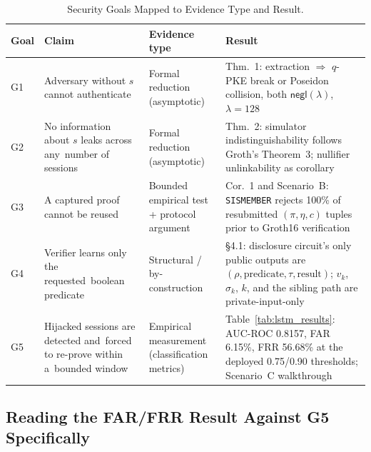\documentclass[12pt,a4paper,oneside]{report}
\begin{document}
\begin{table}[htbp]
\renewcommand{\arraystretch}{1.3}
\caption{Security Goals Mapped to Evidence Type and Result.}
\label{tab:goal_evidence}
\centering
\footnotesize
\begin{tabular}{p{1.6cm}p{3.6cm}p{2.4cm}p{4.0cm}}
\toprule
\textbf{Goal} & \textbf{Claim} & \textbf{Evidence type} & \textbf{Result} \\
\midrule
G1 & Adversary without $s$ cannot authenticate &
Formal reduction (asymptotic) & Thm.~1: extraction $\Rightarrow$
$q$-PKE break or Poseidon collision, both $\mathsf{negl}(\lambda)$,
$\lambda{=}128$ \\[3pt]
G2 & No information about $s$ leaks across any\ number of sessions &
Formal reduction (asymptotic) & Thm.~2: simulator indistinguishability
follows Groth's Theorem~3; nullifier unlinkability as corollary \\[3pt]
G3 & A captured proof cannot be reused &
Bounded empirical test + protocol argument & Cor.~1 and
Scenario~B: \texttt{SISMEMBER} rejects 100\% of resubmitted
$(\pi,\eta,c)$ tuples prior to Groth16 verification \\[3pt]
G4 & Verifier learns only the requested\ boolean predicate &
Structural / by-construction & \S4.1: disclosure circuit's only
public outputs are $(\rho,\text{predicate},\tau,\text{result})$; $v_k$,
$\sigma_k$, $k$, and the sibling path are private-input-only \\[3pt]
G5 & Hijacked sessions are detected and\ forced to re-prove within a\ bounded window &
Empirical measurement (classification metrics) &
Table~\ref{tab:lstm_results}: AUC-ROC 0.8157, FAR 6.15\%, FRR 56.68\%
at the deployed 0.75/0.90 thresholds; Scenario~C walkthrough \\
\bottomrule
\end{tabular}
\end{table}

\subsection{Reading the FAR/FRR Result Against G5 Specifically}
\end{document}
